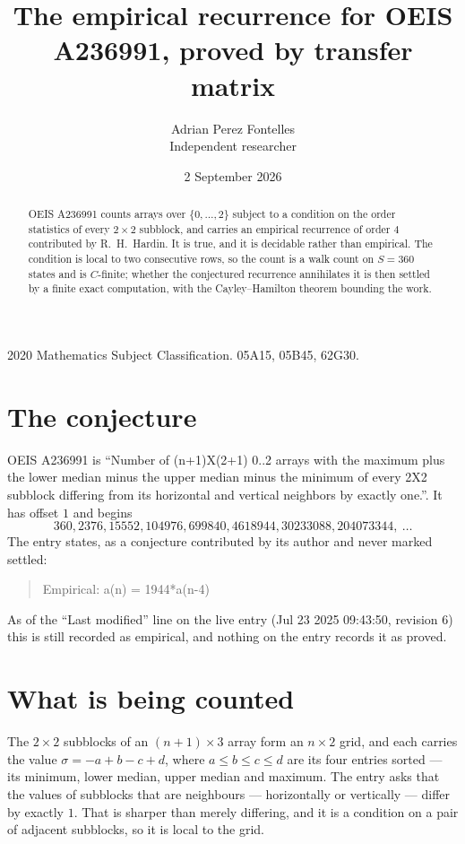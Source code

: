 \documentclass[11pt,a4paper]{article}
\title{The empirical recurrence for OEIS A236991, proved by transfer matrix}
\author{Adrian Perez Fontelles\\ \small Independent researcher}
\date{2 September 2026}
\theoremstyle{plain}
\theoremstyle{definition}
\begin{document}
\maketitle

\begin{abstract}
OEIS A236991 counts arrays over $\{0,\dots,2\}$ subject to a condition on the order
statistics of every $2\times2$ subblock, and carries an empirical recurrence of order
$4$ contributed by R.~H.~Hardin. It is true, and it is decidable rather than empirical.
The condition is local to two consecutive rows, so the count is a walk count on $S=360$
states and is $C$-finite; whether the conjectured recurrence annihilates it is then settled by
a finite exact computation, with the Cayley--Hamilton theorem bounding the work.
\end{abstract}

\noindent\small 2020 Mathematics Subject Classification. 05A15, 05B45, 62G30.\normalsize

\section{The conjecture}

OEIS A236991 is ``Number of (n+1)X(2+1) 0..2 arrays with the maximum plus the lower median minus the upper median minus the minimum of every 2X2 subblock differing from its horizontal and vertical neighbors by exactly one.''. It has offset $1$ and begins
\[
360, 2376, 15552, 104976, 699840, 4618944, 30233088, 204073344,\ \dots
\]
The entry states, as a conjecture contributed by its author and never marked settled:
\begin{quote}
Empirical: a(n) = 1944*a(n-4)
\end{quote}
As of the ``Last modified'' line on the live entry (Jul 23 2025 09:43:50, revision 6) this is still
recorded as empirical, and nothing on the entry records it as proved.

\section{What is being counted}

The $2\times2$ subblocks of an $(n+1)\times3$ array form an
$n\times2$ grid, and each carries the value $\sigma=-a+b-c+d$, where $a\le b\le c\le d$ are its four entries sorted --- its minimum, lower median, upper median and maximum. The entry asks that the values of
subblocks that are neighbours --- horizontally or vertically --- differ by exactly $1$.
That is sharper than merely differing, and it is a condition on a pair of adjacent subblocks,
so it is local to the grid.
\end{document}
